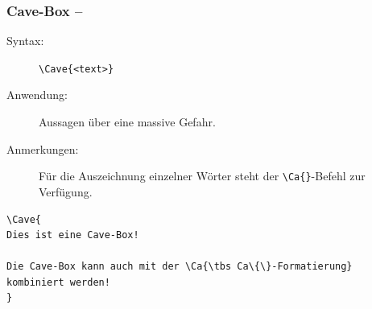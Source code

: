 \documentclass[ngerman,paper=a4,fontsize=8pt,headings=small,draft=no,parskip=half,noonelinecaption]{scrreprt}
\begin{document}

\subsubsection{Cave-Box -- }

\begin{description}
    \item[Syntax:] \lstinline$\Cave{<text>}$
    \item[Anwendung:] Aussagen über eine massive Gefahr.
    \item[Anmerkungen:] Für die Auszeichnung einzelner Wörter steht der
    \lstinline$\Ca{}$-Befehl zur Verfügung.
%     
\end{description}

\begin{lstlisting}
\Cave{
Dies ist eine Cave-Box!

Die Cave-Box kann auch mit der \Ca{\tbs Ca\{\}-Formatierung} kombiniert werden!
}
\end{lstlisting}


% 
% 


% 
% 
% 
% 
% 
\end{document}
